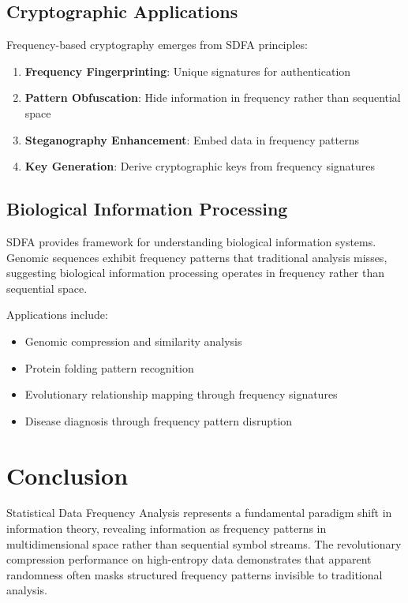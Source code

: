 \documentclass[10pt,journal,compsoc]{IEEEtran}
\newcommand{\sdfa}{\textsc{SDFA}}
\begin{document}
\subsection{Cryptographic Applications}

Frequency-based cryptography emerges from \sdfa{} principles:

\begin{enumerate}
\item \textbf{Frequency Fingerprinting}: Unique signatures for authentication
\item \textbf{Pattern Obfuscation}: Hide information in frequency rather than sequential space
\item \textbf{Steganography Enhancement}: Embed data in frequency patterns
\item \textbf{Key Generation}: Derive cryptographic keys from frequency signatures
\end{enumerate}

\subsection{Biological Information Processing}

\sdfa{} provides framework for understanding biological information systems. Genomic sequences exhibit frequency patterns that traditional analysis misses, suggesting biological information processing operates in frequency rather than sequential space.

Applications include:
\begin{itemize}
\item Genomic compression and similarity analysis
\item Protein folding pattern recognition
\item Evolutionary relationship mapping through frequency signatures
\item Disease diagnosis through frequency pattern disruption
\end{itemize}

\section{Conclusion}

Statistical Data Frequency Analysis represents a fundamental paradigm shift in information theory, revealing information as frequency patterns in multidimensional space rather than sequential symbol streams. The revolutionary compression performance on high-entropy data demonstrates that apparent randomness often masks structured frequency patterns invisible to traditional analysis.
\end{document}
